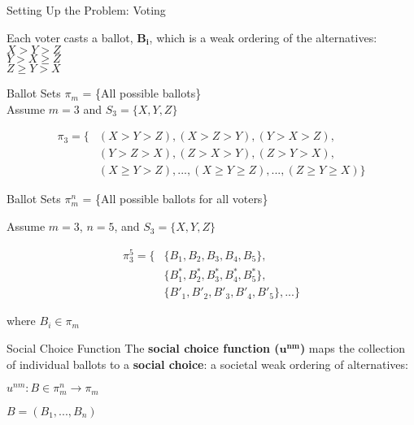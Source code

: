 \documentclass{beamer}
\begin{document}
\begin{frame}{Setting Up the Problem: Voting}

\large Each voter casts a ballot, $\mathbf{B_i}$, which is a weak ordering of the alternatives: \\
\center \huge $X > Y > Z$  \\
\center $Y > X \ge Z$ \\
\center $Z \ge Y > X $
    
\end{frame}

\begin{frame}{Ballot Sets}
    \LARGE $\pi_m$ = \{All possible ballots\} \\ 

    \vskip 1cm
    \large Assume $m = 3$ and $S_3 = \{X, Y, Z\}$

\begin{align*}
    \pi_3 =  \mathbf{\{} & (X > Y > Z), (X > Z > Y), (Y > X > Z), \\ 
    &  (Y > Z > X), (Z > X > Y), (Z > Y > X), \\ 
    & (X \ge Y > Z), ... ,(X \ge Y \ge Z), ... , (Z \ge Y \ge X) \mathbf{\}}
\end{align*}
    
\end{frame}

\begin{frame}{Ballot Sets}
    \LARGE $\pi_m^n$ = \{All possible ballots for all voters\} 

    \vskip 0.5cm

    \large Assume $m = 3$, $n = 5$, and $S_3 = \{X, Y, Z\}$

\begin{align*}
    \pi_3^5 = \{ &\{B_1, B_2, B_3, B_4, B_5\}, \\
    & \{B_1^*, B_2^*, B_3^*, B_4^*, B_5^*\}, \\
    & \{B'_1, B'_2, B'_3, B'_4, B'_5\}, ...\}
\end{align*}

where $B_i \in \pi_m$
\end{frame}


\begin{frame}{Social Choice Function}
    The \textbf{social choice function ($\mathbf{u^{nm}}$)} maps the collection of individual ballots to a \textbf{social choice}: a societal weak ordering of alternatives:

    \vskip 0.5cm

    \center \huge $u^{nm}: B \in \pi_m^n \rightarrow \pi_m$

    \vskip 1cm

\flushright \large $B = (B_1, ... , B_n)$
\end{frame}
\end{document}
